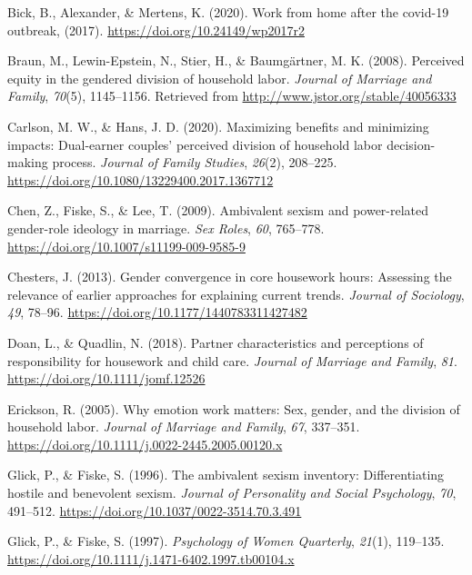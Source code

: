 \documentclass[
  english,
  man]{apa6}
\begin{document}
\leavevmode\hypertarget{ref-Bick}{}%
Bick, B., Alexander, \& Mertens, K. (2020). Work from home after the covid-19 outbreak, (2017). \url{https://doi.org/10.24149/wp2017r2}

\leavevmode\hypertarget{ref-Braun}{}%
Braun, M., Lewin-Epstein, N., Stier, H., \& Baumgärtner, M. K. (2008). Perceived equity in the gendered division of household labor. \emph{Journal of Marriage and Family}, \emph{70}(5), 1145--1156. Retrieved from \url{http://www.jstor.org/stable/40056333}

\leavevmode\hypertarget{ref-Carlson}{}%
Carlson, M. W., \& Hans, J. D. (2020). Maximizing benefits and minimizing impacts: Dual-earner couples' perceived division of household labor decision-making process. \emph{Journal of Family Studies}, \emph{26}(2), 208--225. \url{https://doi.org/10.1080/13229400.2017.1367712}

\leavevmode\hypertarget{ref-Chen}{}%
Chen, Z., Fiske, S., \& Lee, T. (2009). Ambivalent sexism and power-related gender-role ideology in marriage. \emph{Sex Roles}, \emph{60}, 765--778. \url{https://doi.org/10.1007/s11199-009-9585-9}

\leavevmode\hypertarget{ref-Chesters}{}%
Chesters, J. (2013). Gender convergence in core housework hours: Assessing the relevance of earlier approaches for explaining current trends. \emph{Journal of Sociology}, \emph{49}, 78--96. \url{https://doi.org/10.1177/1440783311427482}

\leavevmode\hypertarget{ref-Doan}{}%
Doan, L., \& Quadlin, N. (2018). Partner characteristics and perceptions of responsibility for housework and child care. \emph{Journal of Marriage and Family}, \emph{81}. \url{https://doi.org/10.1111/jomf.12526}

\leavevmode\hypertarget{ref-Erickson}{}%
Erickson, R. (2005). Why emotion work matters: Sex, gender, and the division of household labor. \emph{Journal of Marriage and Family}, \emph{67}, 337--351. \url{https://doi.org/10.1111/j.0022-2445.2005.00120.x}

\leavevmode\hypertarget{ref-Glick1996}{}%
Glick, P., \& Fiske, S. (1996). The ambivalent sexism inventory: Differentiating hostile and benevolent sexism. \emph{Journal of Personality and Social Psychology}, \emph{70}, 491--512. \url{https://doi.org/10.1037/0022-3514.70.3.491}

\leavevmode\hypertarget{ref-ASI}{}%
Glick, P., \& Fiske, S. (1997). \emph{Psychology of Women Quarterly}, \emph{21}(1), 119--135. \url{https://doi.org/10.1111/j.1471-6402.1997.tb00104.x}
\end{document}
